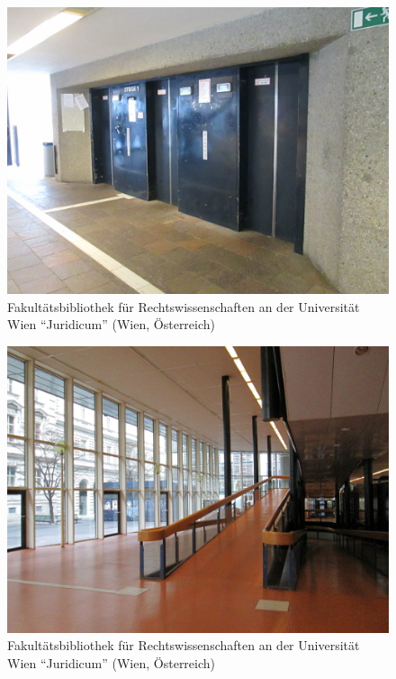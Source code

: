 \documentclass[a4paper,
fontsize=11pt,
oneside,
numbers=noperiodatend,
parskip=half-,
bibliography=totoc,
final
]{scrartcl}
\begin{document}
\begin{figure}[htbp]
\centering
\includegraphics{./img/047.jpg}
\caption{Fakultätsbibliothek für Rechtswissenschaften an der
Universität Wien \enquote{Juridicum} (Wien,
Österreich)}
\end{figure}

\begin{figure}[htbp]
\centering
\includegraphics{./img/048.jpg}
\caption{Fakultätsbibliothek für Rechtswissenschaften an der
Universität Wien \enquote{Juridicum} (Wien,
Österreich)}
\end{figure}
\end{document}
